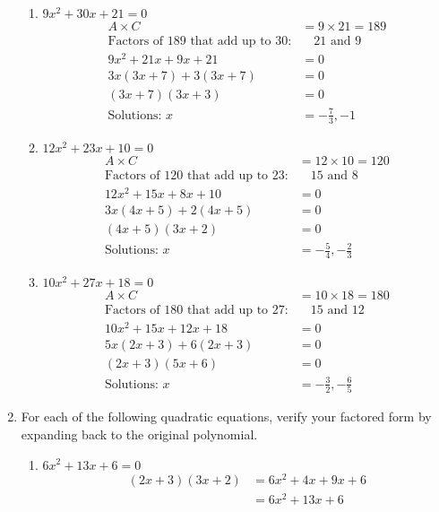 \documentclass[12pt]{article}
\begin{document}
\begin{enumerate}
\begin{enumerate}
        \item $9x^2 + 30x + 21 = 0$
        \begin{align*}
            A \times C & = 9 \times 21 = 189 \\
            \text{Factors of 189 that add up to 30:} & \quad 21 \text{ and } 9 \\
            9x^2 + 21x + 9x + 21 &= 0 \\
            3x(3x + 7) + 3(3x + 7) &= 0 \\
            (3x + 7)(3x + 3) &= 0 \\
            \text{Solutions: } x &= -\frac{7}{3}, -1
        \end{align*}
        
        \item $12x^2 + 23x + 10 = 0$
        \begin{align*}
            A \times C & = 12 \times 10 = 120 \\
            \text{Factors of 120 that add up to 23:} & \quad 15 \text{ and } 8 \\
            12x^2 + 15x + 8x + 10 &= 0 \\
            3x(4x + 5) + 2(4x + 5) &= 0 \\
            (4x + 5)(3x + 2) &= 0 \\
            \text{Solutions: } x &= -\frac{5}{4}, -\frac{2}{3}
        \end{align*}
        
        \item $10x^2 + 27x + 18 = 0$
        \begin{align*}
            A \times C & = 10 \times 18 = 180 \\
            \text{Factors of 180 that add up to 27:} & \quad 15 \text{ and } 12 \\
            10x^2 + 15x + 12x + 18 &= 0 \\
            5x(2x + 3) + 6(2x + 3) &= 0 \\
            (2x + 3)(5x + 6) &= 0 \\
            \text{Solutions: } x &= -\frac{3}{2}, -\frac{6}{5}
        \end{align*}
    \end{enumerate}

    \item For each of the following quadratic equations, verify your factored form by expanding back to the original polynomial.
    \begin{enumerate}
        \item $6x^2 + 13x + 6 = 0$
        \begin{align*}
            (2x + 3)(3x + 2) &= 6x^2 + 4x + 9x + 6 \\
            &= 6x^2 + 13x + 6
        \end{align*}
        

\end{enumerate}
\end{enumerate}
\end{document}
